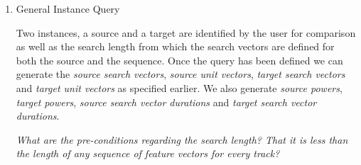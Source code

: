 \documentclass[11pt]{article}
\begin{document}
\begin{enumerate}
\begin{enumerate}
Finally, we define a function called svdurations which takes a sequence of search vectors and calculate the track search vector durations for each sequence.

\begin{axdef}
	durationsIsv : \seq (\seq \Vdsl) \fun (\seq ContIntIndex) \fun \nat \fun  \seq (\seq \R) \\
\where
	\forall svss : \seq (\seq \Vdsl); sl : \nat; ciis :  \seq ContIntIndex @ \\
\t1 	 	durationsIsv ~ svss ~ ciis ~ sl =  \\
\t2		\langle durationsTsv  ~ (head ~ svss) ~ (head ~ ciis) ~ sl   \rangle  \cat \\
\t3  durationsIsv ~ (tail ~ svss) ~ (tail ~ ciis) ~ sl  \land \\
\t1		durationsIsv ~ \langle \rangle~ \langle \rangle ~ sl = \langle \rangle 
\end{axdef}

\end{enumerate}

\begin{schema}{Durations}
	SearchVectors \\
	svdurations : \seq (\seq \R) \\	
\where
	svdurations = durationsIsv ~ searchvs! ~ i?.index ~ sl? 
\end{schema}


\section{Making a Query}

\item \textsf{General Instance Query}

Two instances, a source and a target are identified by the user for comparison as well as the search length from which the search vectors are defined for both the source and the sequence.  Once the query has been defined we can generate the \emph{source search vectors},  \emph{source unit vectors},   \emph{target search vectors} and \emph{target unit vectors} as specified earlier. We also generate \emph{source powers}, \emph{target powers}, \emph{source search vector durations} and \emph{target search vector durations}. 

\emph{What are the pre-conditions regarding the search length? That it is less than the length of any sequence of feature vectors for every track?}


\end{enumerate}
\end{document}
